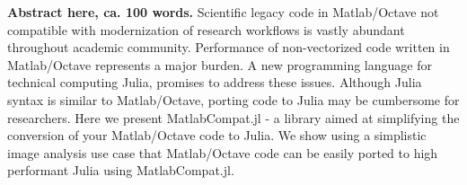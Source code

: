 \textbf{Abstract here, ca. 100 words.}
Scientific legacy code in Matlab/Octave not compatible with modernization of research workflows is vastly abundant throughout academic community. Performance of non-vectorized code written in Matlab/Octave represents a major burden. A new programming language for technical computing Julia, promises to address these issues. Although Julia syntax is similar to Matlab/Octave, porting code to Julia may be cumbersome for researchers. Here we present MatlabCompat.jl - a library aimed at simplifying the conversion of your Matlab/Octave code to Julia. We show using a simplistic image analysis use case that Matlab/Octave code can be easily ported to high performant Julia using MatlabCompat.jl.
  